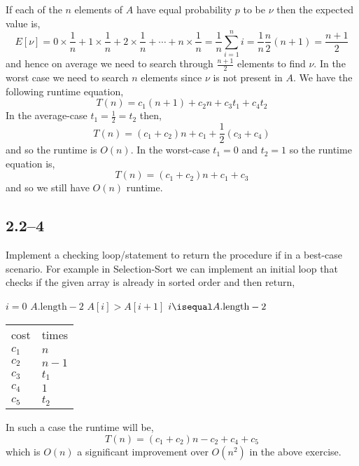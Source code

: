 If each of the $n$ elements of $A$ have equal probability $p$ to be $\nu$ then the expected value is,
\begin{equation*}
	E[\nu] = 0\times\frac{1}{n}+1\times\frac{1}{n} + 2\times\frac{1}{n} + \cdots + n\times\frac{1}{n} = \frac{1}{n}\sum_{i=1}^{n}i = \frac{1}{n}\frac{n}{2}(n+1) = \frac{n+1}{2}
\end{equation*}
and hence on average we need to search through $\frac{n+1}{2}$ elements to find $\nu$. In the worst case we need to search $n$ elements since $\nu$ is not present in $A$. We have the following runtime equation,
\begin{equation*}
	T(n) = c_{1}(n+1) + c_{2}n + c_{3}t_{1} + c_{4}t_{2}
\end{equation*}
In the average-case $t_{1}=\frac{1}{2}=t_{2}$ then,
\begin{equation*}
	T(n) = (c_{1} + c_{2})n + c_{1} + \frac{1}{2}(c_{3} + c_{4})
\end{equation*}
and so the runtime is $O(n)$. In the worst-case $t_{1}=0$ and $t_{2}=1$ so the runtime equation is,
\begin{equation*}
	T(n) = (c_{1} + c_{2})n + c_{1} + c_{3}
\end{equation*}
and so we still have $O(n)$ runtime.

\subsection*{2.2--4}

Implement a checking loop/statement to return the procedure if in a best-case scenario. For example in Selection-Sort we can implement an initial loop that checks if the given array is already in sorted order and then return,
\begin{multicols}{2}
	\begin{codebox}
		\Procname{}
		\li \For $i = 0$ \To $A.\text{length}-2$
		\li \Do
					\If $A[i] > A[i+1]$
		\li		\Then
						\Break
					\End
				\End
		\li \If $i \isequal A.\text{length}-2$
		\li \Then
					\Return
				\End
	\end{codebox}
	\begin{tabular}{ l l }
		cost & times\\
		$c_{1}$ & $n$\\
		$c_{2}$ & $n-1$\\
		$c_{3}$ & $t_{1}$\\
		$c_{4}$ & $1$\\
		$c_{5}$ & $t_{2}$
	\end{tabular}
\end{multicols}
In such a case the runtime will be,
\begin{equation*}
	T(n) = (c_{1}+c_{2})n - c_{2} + c_{4} + c_{5}
\end{equation*}
which is $O(n)$ a significant improvement over $O(n^{2})$ in the above exercise.
